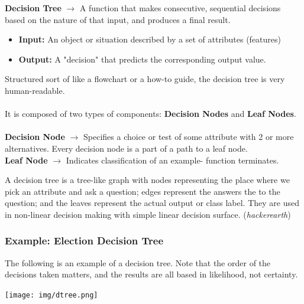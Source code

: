 \documentclass[english, 10pt]{article}
\begin{document}
\begin{tcolorbox}[title=Definition:,colframe=red!75!black,colback=red!5!white,arc=0pt,fonttitle=\bfseries]
\textbf{Decision Tree} $\rightarrow$ A function that makes consecutive, sequential decisions based on the nature of that input, and produces a final result.
\begin{itemize}
	\item \textbf{Input:} An object or situation described by a set of attributes (features)
	\item \textbf{Output:} A "decision" that predicts the corresponding output value.
\end{itemize} 
Structured sort of like a flowchart or a how-to guide, the decision tree is very human-readable.\\\\

It is composed of two types of components: \textbf{Decision Nodes} and \textbf{Leaf Nodes}.\\\\

\textbf{Decision Node} $\rightarrow$ Specifies a choice or test of some attribute with 2 or more alternatives. Every decision node is a part of a path to a leaf node.\\

\textbf{Leaf Node} $\rightarrow$ Indicates classification of an example- function terminates.
\end{tcolorbox}

\hfill \break A decision tree is a tree-like graph with nodes representing the place where we pick an attribute and ask a question; edges represent the answers the to the question; and the leaves represent the actual output or class label. They are used in non-linear decision making with simple linear decision surface. (\textit{hackerearth})

\subsubsection{Example: Election Decision Tree}

The following is an example of a decision tree. Note that the order of the decisions taken matters, and the results are all based in likelihood, not certainty.\\

\begin{center}
	\texttt{[image: img/dtree.png]}\\
\end{center}
\end{document}

